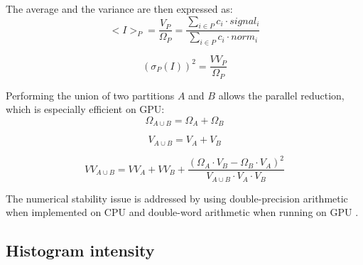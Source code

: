 \documentclass[a4paper,12pt,oneside]{article}              %
\begin{document}
The average and the variance are then expressed as:
\begin{equation}
<I>_P = \frac{V_{P}}{\Omega_{P}} =  \frac{\sum\limits_{i \in P} c_i \cdot signal_i}
                        {\sum\limits_{i \in P} c_i \cdot norm_i} 
\end{equation}

\begin{equation}
(\sigma_P(I))^2 = \frac{VV_{P}}{\Omega_{P}}
\end{equation}

Performing the union of two partitions $A$ and $B$ allows the parallel reduction, which is especially efficient on GPU:
\begin{equation}
\Omega_{A \cup B} =  \Omega_{A} + \Omega_{B} 
\end{equation}

\begin{equation}
V_{A \cup B} =  V_{A} + V_{B} 
\end{equation}
  
\begin{equation}
VV_{A \cup B} =  VV_{A} + VV_{B} +  \frac{(\Omega_{A} \cdot V_{B} - \Omega_{B}\cdot V_{A})^2}{V_{A \cup B} \cdot  V_{A} \cdot V_{B}}
\end{equation}
  
The numerical stability issue is addressed by using double-precision arithmetic when implemented on CPU and double-word arithmetic when running on GPU \cite{double_word}.

\subsection{Histogram intensity }
\end{document}
